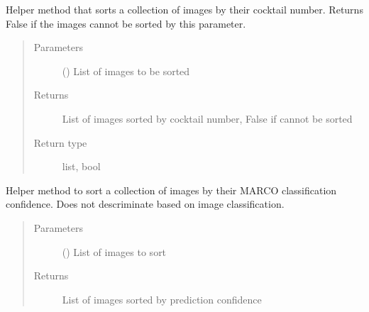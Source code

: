 \documentclass[letterpaper,10pt,english]{sphinxmanual}
\begin{document}
\begin{fulllineitems}
\begin{fulllineitems}
\label{\detokenize{polo.widgets:polo.widgets.slideshow_inspector.slideshowInspector.sort_images_by_cocktail_number}}
Helper method that sorts a collection of images by their
cocktail number. Returns False if the images cannot be sorted
by this parameter.
\begin{quote}\begin{description}
\item[{Parameters}] \leavevmode
{} () \textendash{} List of images to be sorted

\item[{Returns}] \leavevmode
List of images sorted by cocktail number, False if cannot be sorted

\item[{Return type}] \leavevmode
list, bool

\end{description}\end{quote}

\end{fulllineitems}


\begin{fulllineitems}
\label{\detokenize{polo.widgets:polo.widgets.slideshow_inspector.slideshowInspector.sort_images_by_marco_confidence}}
Helper method to sort a collection of images by their MARCO
classification confidence. Does not descriminate based on
image classification.
\begin{quote}\begin{description}
\item[{Parameters}] \leavevmode
{} () \textendash{} List of images to sort

\item[{Returns}] \leavevmode
List of images sorted by prediction confidence


\end{description}
\end{quote}
\end{fulllineitems}
\end{fulllineitems}
\end{document}
